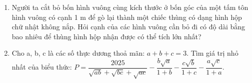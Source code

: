 \begin{ex}
\begin{enumerate}
		\item[a)] Người ta cắt bỏ bốn hình vuông cùng kích thước ở bốn góc của một tấm tôn hình vuông có cạnh 1 m để gò lại thành một chiếc thùng có dạng hình hộp chữ nhật không nắp. Hỏi cạnh của các hình vuông cần bỏ đi có độ dài bằng bao nhiêu để thùng hình hộp nhận được có thể tích lớn nhất?
		\item[b)] Cho a, b, c là các số thực dương thoả mãn: $a+b+c=3$.
		Tìm giá trị nhỏ nhất của biểu thức: $P = \dfrac{2025}{\sqrt{ab}+\sqrt{bc}+\sqrt{ac}} - \dfrac{b\sqrt{a}}{1+b} - \dfrac{c\sqrt{b}}{1+c} - \dfrac{a\sqrt{c}}{1+a}$.
	\end{enumerate}
\end{ex}
